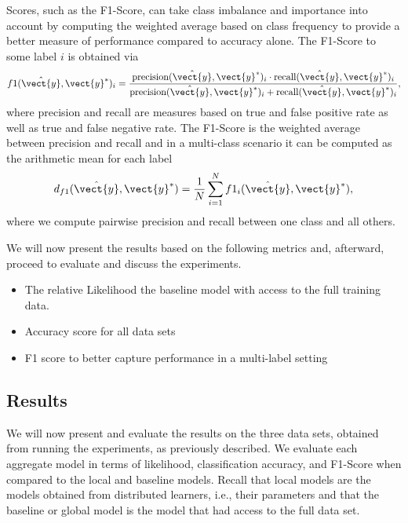 Scores, such as the F1-Score, can take class imbalance and importance into account by computing the weighted average based on class frequency to provide a better measure of performance compared to accuracy alone.
The F1-Score \wrt to some label $i$ is obtained via 
\begin{equation}
    f1(\hat{\vect{y}},\vect{y}^*)_i = \frac{\text{precision}(\hat{\vect{y}},\vect{y}^*)_i \cdot \text{recall}(\hat{\vect{y}},\vect{y}^*)_i}{\text{precision}(\hat{\vect{y}},\vect{y}^*)_i + \text{recall}(\hat{\vect{y}},\vect{y}^*)_i},
\end{equation}
where precision and recall are measures based on true and false positive rate as well as true and false negative rate.\cite{friedman2001elements} \cite{hossin2015review}
The F1-Score is the weighted average between precision and recall and in a multi-class scenario it can be computed as the arithmetic mean for each label
\begin{equation}
    d_{f1}(\hat{\vect{y}},\vect{y}^*) = \frac{1}{N} \sum_{i=1}^N f1_i(\hat{\vect{y}},\vect{y}^*),
\end{equation}
where we compute pairwise precision and recall between one class and all others.

We will now present the results based on the following metrics and, afterward, proceed to evaluate and discuss the experiments.
\begin{itemize}
    \item The relative Likelihood \wrt the baseline model with access to the full training data.
    \item Accuracy score for all data sets
    \item F1 score to better capture performance in a multi-label setting 
\end{itemize}


\subsection{Results}
We will now present and evaluate the results on the three data sets, obtained from running the experiments, as previously described. 
We evaluate each aggregate model in terms of likelihood, classification accuracy, and F1-Score when compared to the local and baseline models.
Recall that local models are the models obtained from distributed learners, i.e., their parameters and that the baseline or global model is the model that had access to the full data set.

